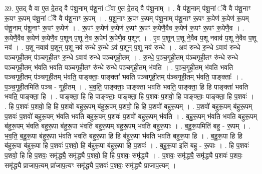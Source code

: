 \documentclass[17pt]{extarticle}
\begin{document}
39. ए॒तद् वै वा ए॒त दे॒तद् वै प॑शू॒नाम् प॑शू॒नां ॅवा ए॒त दे॒तद् वै प॑शू॒नाम् । . वै प॑शू॒नाम् प॑शू॒नां ॅवै वै प॑शू॒नाꣳ रू॒पꣳ रू॒पम् प॑शू॒नां ॅवै वै प॑शू॒नाꣳ रू॒पम् । . प॒शू॒नाꣳ रू॒पꣳ रू॒पम् प॑शू॒नाम् प॑शू॒नाꣳ रू॒पꣳ रू॒पेण॑ रू॒पेण॑ रू॒पम् प॑शू॒नाम् प॑शू॒नाꣳ रू॒पꣳ रू॒पेण॑ । . रू॒पꣳ रू॒पेण॑ रू॒पेण॑ रू॒पꣳ रू॒पꣳ रू॒पेणै॒वैव रू॒पेण॑ रू॒पꣳ रू॒पꣳ रू॒पेणै॒व । . रू॒पेणै॒वैव रू॒पेण॑ रू॒पेणै॒व प॒शून् प॒शू ने॒व रू॒पेण॑ रू॒पेणै॒व प॒शून् । . ए॒व प॒शून् प॒शू ने॒वैव प॒शू नवाव॑ प॒शू ने॒वैव प॒शू नव॑ । . प॒शू नवाव॑ प॒शून् प॒शू नव॑ रुन्धे रु॒न्धे ऽव॑ प॒शून् प॒शू नव॑ रुन्धे । . अव॑ रुन्धे रु॒न्धे ऽवाव॑ रुन्धे पञ्चगृही॒तम् प॑ञ्चगृही॒तꣳ रु॒न्धे ऽवाव॑ रुन्धे पञ्चगृही॒तम् । . रु॒न्धे॒ प॒ञ्च॒गृ॒ही॒तम् प॑ञ्चगृही॒तꣳ रु॑न्धे रुन्धे पञ्चगृही॒तम् भ॑वति भवति पञ्चगृही॒तꣳ रु॑न्धे रुन्धे पञ्चगृही॒तम् भ॑वति । . प॒ञ्च॒गृ॒ही॒तम् भ॑वति भवति पञ्चगृही॒तम् प॑ञ्चगृही॒तम् भ॑वति॒ पाङ्क्ताः॒ पाङ्क्ता॑ भवति पञ्चगृही॒तम् प॑ञ्चगृही॒तम् भ॑वति॒ पाङ्क्ताः᳚ । . प॒ञ्च॒गृ॒ही॒तमिति॑ पञ्च - गृ॒ही॒तम् । . भ॒व॒ति॒ पाङ्क्ताः॒ पाङ्क्ता॑ भवति भवति॒ पाङ्क्ता॒ हि हि पाङ्क्ता॑ भवति भवति॒ पाङ्क्ता॒ हि । . पाङ्क्ता॒ हि हि पाङ्क्ताः॒ पाङ्क्ता॒ हि प॒शवः॑ प॒शवो॒ हि पाङ्क्ताः॒ पाङ्क्ता॒ हि प॒शवः॑ । . हि प॒शवः॑ प॒शवो॒ हि हि प॒शवो॑ बहुरू॒पम् ब॑हुरू॒पम् प॒शवो॒ हि हि प॒शवो॑ बहुरू॒पम् । . प॒शवो॑ बहुरू॒पम् ब॑हुरू॒पम् प॒शवः॑ प॒शवो॑ बहुरू॒पम् भ॑वति भवति बहुरू॒पम् प॒शवः॑ प॒शवो॑ बहुरू॒पम् भ॑वति । . ब॒हु॒रू॒पम् भ॑वति भवति बहुरू॒पम् ब॑हुरू॒पम् भ॑वति बहुरू॒पा ब॑हुरू॒पा भ॑वति बहुरू॒पम् ब॑हुरू॒पम् भ॑वति बहुरू॒पाः । . ब॒हु॒रू॒पमिति॑ बहु - रू॒पम् । . भ॒व॒ति॒ ब॒हु॒रू॒पा ब॑हुरू॒पा भ॑वति भवति बहुरू॒पा हि हि ब॑हुरू॒पा भ॑वति भवति बहुरू॒पा हि । . ब॒हु॒रू॒पा हि हि ब॑हुरू॒पा ब॑हुरू॒पा हि प॒शवः॑ प॒शवो॒ हि ब॑हुरू॒पा ब॑हुरू॒पा हि प॒शवः॑ । . ब॒हु॒रू॒पा इति॑ बहु - रू॒पाः । . हि प॒शवः॑ प॒शवो॒ हि हि प॒शवः॒ समृ॑द्ध्यै॒ समृ॑द्ध्यै प॒शवो॒ हि हि प॒शवः॒ समृ॑द्ध्यै । . प॒शवः॒ समृ॑द्ध्यै॒ समृ॑द्ध्यै प॒शवः॑ प॒शवः॒ समृ॑द्ध्यै प्राजाप॒त्यम् प्रा॑जाप॒त्यꣳ समृ॑द्ध्यै प॒शवः॑ प॒शवः॒ समृ॑द्ध्यै प्राजाप॒त्यम् । \newline
\pagebreak
{}
\end{document}

